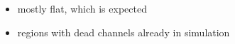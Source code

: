 \documentclass[18pt]{beamer}
\begin{document}
\begin{frame}
\begin{columns}
\begin{column}{0.5\textwidth}
    \end{column}
  \end{columns}
  \begin{itemize}
  \item mostly flat, which is expected
  \item regions with dead channels already in simulation
  \end{itemize}
\end{frame}
\end{document}
